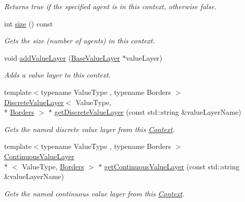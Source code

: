 \begin{DoxyCompactItemize}
\begin{DoxyCompactList}\small\item\em Returns true if the specified agent is in this context, otherwise false. \end{DoxyCompactList}\item 
\hypertarget{classrepast_1_1_context_aa86fbff836e4066f98c893157c76db88}{int \hyperlink{classrepast_1_1_context_aa86fbff836e4066f98c893157c76db88}{size} () const }\label{classrepast_1_1_context_aa86fbff836e4066f98c893157c76db88}

\begin{DoxyCompactList}\small\item\em Gets the size (number of agents) in this context. \end{DoxyCompactList}\item 
void \hyperlink{classrepast_1_1_context_a9120a6aac361baa92d6dbd83410ff576}{add\-Value\-Layer} (\hyperlink{classrepast_1_1_base_value_layer}{Base\-Value\-Layer} $\ast$value\-Layer)
\begin{DoxyCompactList}\small\item\em Adds a value layer to this context. \end{DoxyCompactList}\item 
{\footnotesize template$<$typename Value\-Type , typename Borders $>$ }\\\hyperlink{classrepast_1_1_discrete_value_layer}{Discrete\-Value\-Layer}$<$ Value\-Type, \\*
\hyperlink{classrepast_1_1_borders}{Borders} $>$ $\ast$ \hyperlink{classrepast_1_1_context_ac4e06221e76065ae8ee50815bb1a7a41}{get\-Discrete\-Value\-Layer} (const std\-::string \&value\-Layer\-Name)
\begin{DoxyCompactList}\small\item\em Gets the named discrete value layer from this \hyperlink{classrepast_1_1_context}{Context}. \end{DoxyCompactList}\item 
{\footnotesize template$<$typename Value\-Type , typename Borders $>$ }\\\hyperlink{classrepast_1_1_continuous_value_layer}{Continuous\-Value\-Layer}\\*
$<$ Value\-Type, \hyperlink{classrepast_1_1_borders}{Borders} $>$ $\ast$ \hyperlink{classrepast_1_1_context_a9ac760826f1f535b474af50dec727e9f}{get\-Continuous\-Value\-Layer} (const std\-::string \&value\-Layer\-Name)
\begin{DoxyCompactList}\small\item\em Gets the named continuous value layer from this \hyperlink{classrepast_1_1_context}{Context}. \end{DoxyCompactList}\item 

\end{DoxyCompactItemize}
